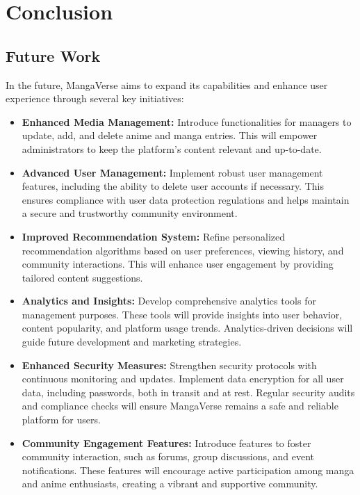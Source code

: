 \chapter{Conclusion}


\section{Future Work}

In the future, MangaVerse aims to expand its capabilities and enhance user experience through several key initiatives:

\begin{itemize}
\item \textbf{Enhanced Media Management:} Introduce functionalities for managers to update, add, and delete anime and manga entries.
This will empower administrators to keep the platform's content relevant and up-to-date.

\item \textbf{Advanced User Management:} Implement robust user management features, including the ability to delete user accounts
if necessary. This ensures compliance with user data protection regulations and helps maintain a secure and trustworthy
community environment.

\item \textbf{Improved Recommendation System:} Refine personalized recommendation algorithms based on user preferences,
viewing history, and community interactions. This will enhance user engagement by providing tailored content suggestions.

\item \textbf{Analytics and Insights:} Develop comprehensive analytics tools for management purposes. These tools will provide
insights into user behavior, content popularity, and platform usage trends. Analytics-driven decisions will guide future
development and marketing strategies.

\item \textbf{Enhanced Security Measures:} Strengthen security protocols with continuous monitoring and updates. Implement
data encryption for all user data, including passwords, both in transit and at rest. Regular security audits and compliance
checks will ensure MangaVerse remains a safe and reliable platform for users.

\item \textbf{Community Engagement Features:} Introduce features to foster community interaction, such as forums, group
discussions, and event notifications. These features will encourage active participation among manga and anime enthusiasts,
creating a vibrant and supportive community.
\end{itemize}

